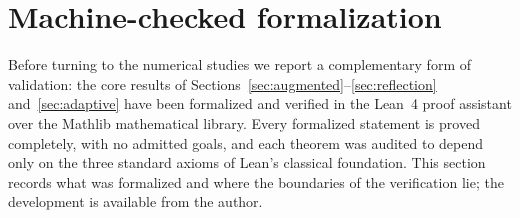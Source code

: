 \documentclass[11pt,american]{article}
\theoremstyle{definition}
\theoremstyle{plain}
\theoremstyle{remark}
\begin{document}
\section{Machine-checked formalization}\label{sec:lean}

Before turning to the numerical studies we report a complementary form of validation: the core results of Sections~\ref{sec:augmented}--\ref{sec:reflection} and~\ref{sec:adaptive} have been formalized and verified in the Lean~4 proof assistant over the Mathlib mathematical library. Every formalized statement is proved completely, with no admitted goals, and each theorem was audited to depend only on the three standard axioms of Lean's classical foundation. This section records what was formalized and where the boundaries of the verification lie; the development is available from the author.
\end{document}
